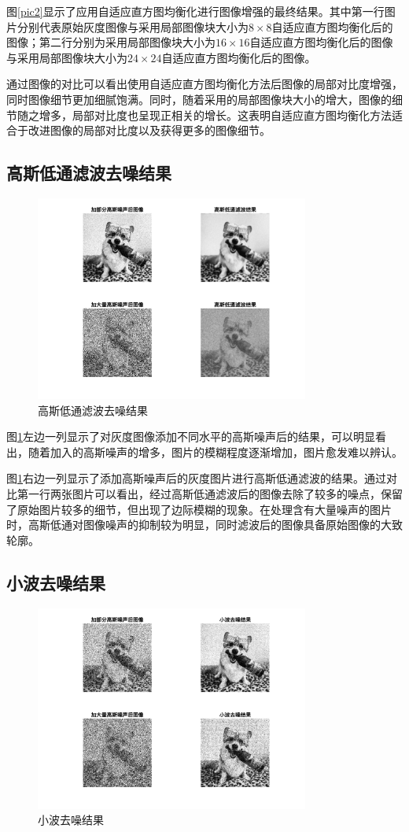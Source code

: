 \documentclass[conference]{IEEEtran}
\begin{document}
图\ref{pic2}显示了应用自适应直方图均衡化\cite{b2}进行图像增强的最终结果。其中第一行图片分别代表原始灰度图像与采用局部图像块大小为$8\times 8$自适应直方图均衡化后的图像；第二行分别为采用局部图像块大小为$16\times 16$自适应直方图均衡化后的图像与采用局部图像块大小为$24\times 24$自适应直方图均衡化后的图像。

通过图像的对比可以看出使用自适应直方图均衡化方法后图像的局部对比度增强，同时图像细节更加细腻饱满。同时，随着采用的局部图像块大小的增大，图像的细节随之增多，局部对比度也呈现正相关的增长。这表明自适应直方图均衡化方法适合于改进图像的局部对比度以及获得更多的图像细节。

\subsection{高斯低通滤波去噪结果}
\begin{figure}[htbp]
	\centerline{
		\includegraphics[width=9cm]{GL.png} 	
	}
	\caption{高斯低通滤波去噪结果}
	\label{pic3}
\end{figure}

图\ref{pic3}左边一列显示了对灰度图像添加不同水平的高斯噪声后的结果，可以明显看出，随着加入的高斯噪声的增多，图片的模糊程度逐渐增加，图片愈发难以辨认。

图\ref{pic3}右边一列显示了添加高斯噪声后的灰度图片进行高斯低通滤波的结果。通过对比第一行两张图片可以看出，经过高斯低通滤波后的图像去除了较多的噪点，保留了原始图片较多的细节，但出现了边际模糊的现象。在处理含有大量噪声的图片时，高斯低通对图像噪声的抑制较为明显，同时滤波后的图像具备原始图像的大致轮廓。

\subsection{小波去噪结果}
\begin{figure}[htbp]
	\centerline{
		\includegraphics[width=9cm]{LW滤波结果.png} 	
	}
	\caption{小波去噪结果}
	\label{pic4}
\end{figure}
\end{document}

